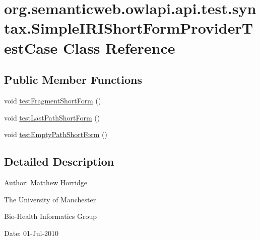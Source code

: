 \hypertarget{classorg_1_1semanticweb_1_1owlapi_1_1api_1_1test_1_1syntax_1_1_simple_i_r_i_short_form_provider_test_case}{\section{org.\-semanticweb.\-owlapi.\-api.\-test.\-syntax.\-Simple\-I\-R\-I\-Short\-Form\-Provider\-Test\-Case Class Reference}
\label{classorg_1_1semanticweb_1_1owlapi_1_1api_1_1test_1_1syntax_1_1_simple_i_r_i_short_form_provider_test_case}
}
\subsection*{Public Member Functions}
\begin{DoxyCompactItemize}
\item 
void \hyperlink{classorg_1_1semanticweb_1_1owlapi_1_1api_1_1test_1_1syntax_1_1_simple_i_r_i_short_form_provider_test_case_a9d52838c4b1e1dae555801f6974a42e3}{test\-Fragment\-Short\-Form} ()
\item 
void \hyperlink{classorg_1_1semanticweb_1_1owlapi_1_1api_1_1test_1_1syntax_1_1_simple_i_r_i_short_form_provider_test_case_a89e0d2ec165881c89e6a43bdb81becf3}{test\-Last\-Path\-Short\-Form} ()
\item 
void \hyperlink{classorg_1_1semanticweb_1_1owlapi_1_1api_1_1test_1_1syntax_1_1_simple_i_r_i_short_form_provider_test_case_ab7be57a4a94d875e8819d2a83e70a60c}{test\-Empty\-Path\-Short\-Form} ()
\end{DoxyCompactItemize}


\subsection{Detailed Description}
Author\-: Matthew Horridge\par
 The University of Manchester\par
 Bio-\/\-Health Informatics Group\par
 Date\-: 01-\/\-Jul-\/2010 

